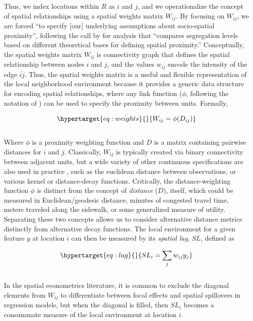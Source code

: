 \documentclass[
  10pt,
]{article}
\begin{document}
Thus, we index locations within \(R\) as \(i\) and \(j\), and we
operationalize the concept of spatial relationships using a spatial
weights matrix \(W_{ij}\). By focusing on \(W_{ij}\), we are forced ``to
specify {[}our{]} underlying assumptions about socio-spatial
proximity'', following the call by
\citet[p.154]{reardon2004MeasuresSpatial} for analysis that ``compares
segregation levels based on different theoretical bases for defining
spatial proximity.'' Conceptually, the spatial weights matrix \(W_{ij}\)
is connectivity graph that defines the spatial relationship between
nodes \(i\) and \(j\), and the values \(w_{ij}\) encode the intensity of
the edge \(\bar{ij}\). Thus, the spatial weights matrix is a useful and
flexible representation of the local neighborhood environment because it
provides a generic data structure for encoding spatial relationships,
where any link function (\(\phi\), following the notation of
\citet{reardon2004MeasuresSpatial}) can be used to specify the proximity
between units. Formally,

\begin{equation}\protect\hypertarget{eq:weights}{}{
W_{ij} = \phi(D_{ij})
}\label{eq:weights}\end{equation}\\
Where \(\phi\) is a proximity weighting function and \(D\) is a matrix
containing pairwise distances for \(i\) and \(j\). Classically,
\(W_{ij}\) is typically created via binary connectivity between adjacent
units, but a wide variety of other continuous specifications are also
used in practice
\citep{getis2009SpatialWeights, rey2010PySALPython, halleckvega2015SLXMODEL},
such as the euclidean distance between observations, or various kernel
or distance-decay functions. Critically, the distance-weighting function
\(\phi\) is distinct from the concept of \emph{distance} (\(D\)),
itself, which could be measured in Euclidean/geodesic distance, minutes
of congested travel time, meters traveled along the sidewalk, or some
generalized measure of utility. Separating these two concepts allows us
to consider alternative distance metrics distinctly from alternative
decay functions. The local environment for a given feature \(y\) at
location \(i\) can then be measured by its \emph{spatial lag}, \(SL\),
defined as

\begin{equation}\protect\hypertarget{eq:lag}{}{
SL_i = \sum_j w_{ij} y_j
}\label{eq:lag}\end{equation}\\
In the spatial econometrics literature, it is common to exclude the
diagonal elements from \(W_{ij}\) to differentiate between focal effects
and spatial spillovers in regression models, but when the diagonal is
filled, then \(SL_i\) becomes a consummate measure of the local
environment at location \(i\).
\end{document}
